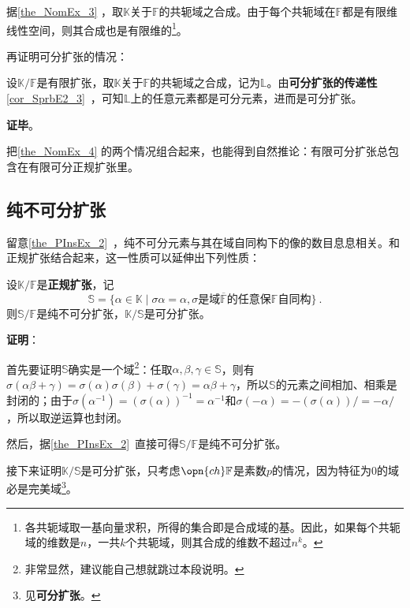 据\autoref{the_NomEx_3} ，取$\mathbb{K}$关于$\mathbb{F}$的共轭域之合成。由于每个共轭域在$\mathbb{F}$都是有限维线性空间，则其合成也是有限维的\footnote{各共轭域取一基向量求积，所得的集合即是合成域的基。因此，如果每个共轭域的维数是$n$，一共$k$个共轭域，则其合成的维数不超过$n^k$。}。

再证明可分扩张的情况：

设$\mathbb{K}/\mathbb{F}$是有限扩张，取$\mathbb{K}$关于$\mathbb{F}$的共轭域之合成，记为$\mathbb{L}$。由\textbf{可分扩张的传递性}\autoref{cor_SprbE2_3}~，可知$\mathbb{L}$上的任意元素都是可分元素，进而是可分扩张。

\textbf{证毕}。

把\autoref{the_NomEx_4} 的两个情况组合起来，也能得到自然推论：有限可分扩张总包含在有限可分正规扩张里。


\subsection{纯不可分扩张}



留意\autoref{the_PInsEx_2}~，纯不可分元素与其在域自同构下的像的数目息息相关。和正规扩张结合起来，这一性质可以延伸出下列性质：

\begin{theorem}{}\label{the_NomEx_5}
设$\mathbb{K}/\mathbb{F}$是\textbf{正规扩张}，记
\begin{equation}\label{eq_NomEx_1}
\mathbb{S}=\{\alpha\in\mathbb{K}\mid \sigma\alpha = \alpha, \sigma\text{是域}\overline{\mathbb{F}}\text{的任意保}\mathbb{F}\text{自同构}\}~.
\end{equation}
则$\mathbb{S}/\mathbb{F}$是纯不可分扩张，$\mathbb{K}/\mathbb{S}$是可分扩张。
\end{theorem}

\textbf{证明}：

首先要证明$\mathbb{S}$确实是一个域\footnote{非常显然，建议能自己想就跳过本段说明。}：任取$\alpha, \beta, \gamma\in\mathbb{S}$，则有$\sigma(\alpha\beta+\gamma)=\sigma(\alpha)\sigma(\beta)+\sigma(\gamma)=\alpha\beta+\gamma$，所以$\mathbb{S}$的元素之间相加、相乘是封闭的；由于$\sigma(\alpha^{-1})=(\sigma(\alpha))^{-1}=\alpha^{-1}$和$\sigma(-\alpha)=-(\sigma(\alpha))/=-\alpha/$，所以取逆运算也封闭。

然后，据\autoref{the_PInsEx_2}~直接可得$\mathbb{S}/\mathbb{F}$是纯不可分扩张。

接下来证明$\mathbb{K}/\mathbb{S}$是可分扩张，只考虑$\opn{ch}\mathbb{F}$是素数$p$的情况，因为特征为$0$的域必是完美域\footnote{见\textbf{可分扩张}。}。

